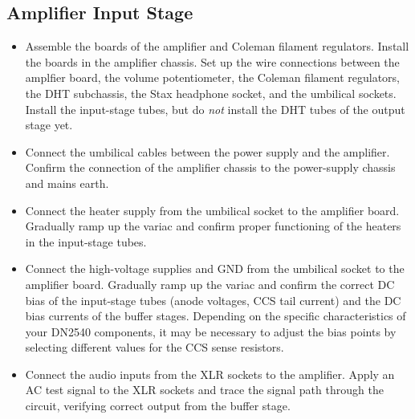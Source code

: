 \subsection{Amplifier Input Stage}
\begin{itemize}
\item Assemble the boards of the amplifier and Coleman filament regulators. Install the boards in the amplifier chassis. Set up the wire connections between the amplfier board, the volume potentiometer, the Coleman filament regulators, the DHT subchassis, the Stax headphone socket, and the umbilical sockets. Install the input-stage tubes, but do \emph{not} install the DHT tubes of the output stage yet.
\item Connect the umbilical cables between the power supply and the amplifier. Confirm the connection of the amplifier chassis to the power-supply chassis and mains earth.
\item Connect the heater supply from the umbilical socket to the amplifier board. Gradually ramp up the variac and confirm proper functioning of the heaters in the input-stage tubes.
\item Connect the high-voltage supplies and GND from the umbilical socket to the amplifier board. Gradually ramp up the variac and confirm the correct DC bias of the input-stage tubes (anode voltages, CCS tail current) and the DC bias currents of the buffer stages. Depending on the specific characteristics of your DN2540 components, it may be necessary to adjust the bias points by selecting different values for the CCS sense resistors.
\item Connect the audio inputs from the XLR sockets to the amplifier. Apply an AC test signal to the XLR sockets and trace the signal path through the circuit, verifying correct output from the buffer stage.
\end{itemize}

